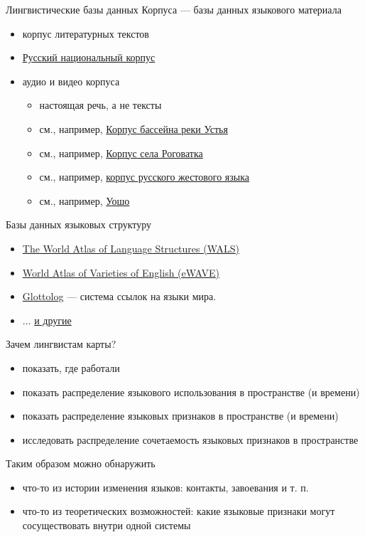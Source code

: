 \documentclass[13pt, t, aspectratio=169]{beamer}
\begin{document}

\begin{frame}{Лингвистические базы данных}
\alert{\large Корпуса --- базы данных языкового материала}
\begin{itemize}
\item корпус литературных текстов
\item \href{http://ruscorpora.ru/}{Русский национальный корпус}
\item аудио и видео корпуса \pause
\begin{itemize}
\item настоящая речь, а не тексты
\item см., например, \href{http://www.parasolcorpus.org/Pushkino/login.php}{Корпус бассейна реки Устья}
\item см., например, \href{http://www.parasolcorpus.org/Rogovatka/}{Корпус села Роговатка}
\item см., например, \href{http://rsl.nstu.ru}{корпус русского жестового языка}
\item см., например, \href{https://www.youtube.com/watch?v=OUwOvF7TqgA&feature=youtu.be&t=1m25s}{Уошо}
\end{itemize}
\end{itemize}
\vfill
\alert{\large Базы данных языковых структуру}
\begin{itemize}
\item \href{https://wals.info/}{The World Atlas of Language Structures (WALS)}
\item \href{https://ewave-atlas.org/}{World Atlas of Varieties of English (eWAVE)}
\item \href{https://glottolog.org/}{Glottolog} --- система ссылок на языки мира.
\item ... \href{https://clld.org/datasets.html}{и другие}
\end{itemize}
\end{frame}

\begin{frame}{Зачем лингвистам карты?}
\begin{itemize}
\item показать, где работали
\item показать распределение языкового использования в пространстве (и времени)
\item показать распределение языковых признаков в пространстве (и времени)
\item исследовать распределение сочетаемость языковых признаков в пространстве
\end{itemize}
\vfill
Таким образом можно обнаружить
\begin{itemize}
\item что-то из истории изменения языков: контакты, завоевания и т. п.
\item что-то из теоретических возможностей: какие языковые признаки могут сосуществовать внутри одной системы
\end{itemize}


\end{frame}
\end{document}
